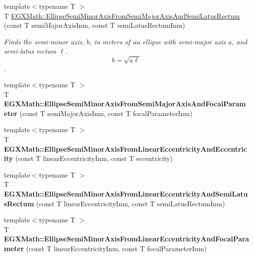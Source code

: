 \begin{DoxyCompactItemize}
{\footnotesize template$<$typename T $>$ }\\T \mbox{\hyperlink{group___e_g_x_math-_geometry-2_d-_ellipse-_semi_minor_axis_gaed84cd29b0768dd8eb2628b69e5c163f}{E\+G\+X\+Math\+::\+Ellipse\+Semi\+Minor\+Axis\+From\+Semi\+Major\+Axis\+And\+Semi\+Latus\+Rectum}} (const T semi\+Major\+Axis\+Inm, const T semi\+Latus\+Rectum\+Inm)
\begin{DoxyCompactList}\small\item\em Finds the semi-\/minor axis, $b$, in meters of an ellipse with semi-\/major axis $a$, and semi-\/latus rectum $\ell$. \[ b= \sqrt{a\ell} \]. \end{DoxyCompactList}\item 
\mbox{\label{group___e_g_x_math-_geometry-2_d-_ellipse-_semi_minor_axis_ga49cd1c9a110ae740e606d1f012edf037}} 
{\footnotesize template$<$typename T $>$ }\\T {\bfseries E\+G\+X\+Math\+::\+Ellipse\+Semi\+Minor\+Axis\+From\+Semi\+Major\+Axis\+And\+Focal\+Parameter} (const T semi\+Major\+Axis\+Inm, const T focal\+Parameter\+Inm)
\item 
\mbox{\label{group___e_g_x_math-_geometry-2_d-_ellipse-_semi_minor_axis_ga7d19bfb56b8d9678c8ff7c843e1ae3b6}} 
{\footnotesize template$<$typename T $>$ }\\T {\bfseries E\+G\+X\+Math\+::\+Ellipse\+Semi\+Minor\+Axis\+From\+Linear\+Eccentricity\+And\+Eccentricity} (const T linear\+Eccentricity\+Inm, const T eccentricity)
\item 
\mbox{\label{group___e_g_x_math-_geometry-2_d-_ellipse-_semi_minor_axis_gac4b0e45f43bee20fc64bbdd421ebc956}} 
{\footnotesize template$<$typename T $>$ }\\T {\bfseries E\+G\+X\+Math\+::\+Ellipse\+Semi\+Minor\+Axis\+From\+Linear\+Eccentricity\+And\+Semi\+Latus\+Rectum} (const T linear\+Eccentricity\+Inm, const T semi\+Latus\+Rectum\+Inm)
\item 
\mbox{\label{group___e_g_x_math-_geometry-2_d-_ellipse-_semi_minor_axis_ga03cbc96729f84c9691bf1c5bfcc6b083}} 
{\footnotesize template$<$typename T $>$ }\\T {\bfseries E\+G\+X\+Math\+::\+Ellipse\+Semi\+Minor\+Axis\+From\+Linear\+Eccentricity\+And\+Focal\+Parameter} (const T linear\+Eccentricity\+Inm, const T focal\+Parameter\+Inm)

\end{DoxyCompactItemize}
